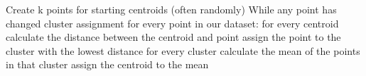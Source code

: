 Create k points for starting centroids (often randomly)
While any point has changed cluster assignment
      for every point in our dataset:
          for every centroid
              calculate the distance between the centroid and point
          assign the point to the cluster with the lowest distance
      for every cluster calculate the mean of the points in that cluster
          assign the centroid to the mean
